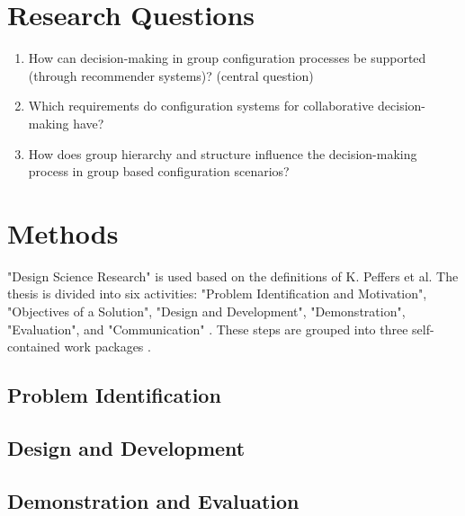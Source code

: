\documentclass{article}
\begin{document}
\section{Research Questions}

\begin{enumerate}
    \item How can decision-making in group configuration processes be supported (through recommender systems)? (central question)
    \item Which requirements do configuration systems for collaborative decision-making have?
    \item How does group hierarchy and structure influence the decision-making process in group based configuration scenarios?
\end{enumerate}

\section{Methods}

"Design Science Research" is used based on the definitions of K. Peffers et al. The thesis is divided into six activities: "Problem Identification and Motivation", "Objectives of a Solution", "Design and Development", "Demonstration", "Evaluation", and "Communication" \cite{peffersDesignScienceResearch2007}. 
These steps are grouped into three self-contained work packages \cite[p.~6]{offermannOutlineDesignScience2009}.

\subsection{Problem Identification}

\subsection{Design and Development}

\subsection{Demonstration and Evaluation}

\printbibliography[heading=bibintoc]
\end{document}

